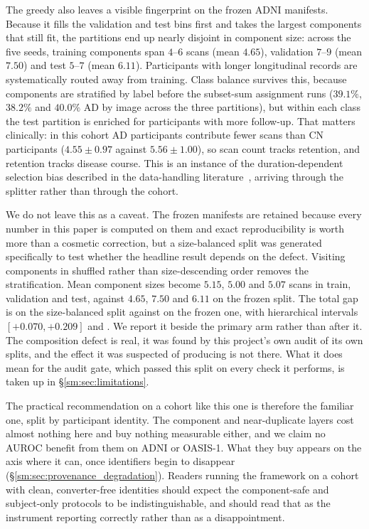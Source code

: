\documentclass[11pt]{article}
\begin{document}
The greedy also leaves a visible fingerprint on the frozen ADNI
manifests. Because it fills the validation and test bins first and
takes the largest components that still fit, the partitions end up
nearly disjoint in component size: across the five seeds, training
components span $4$--$6$ scans (mean $4.65$), validation $7$--$9$
(mean $7.50$) and test $5$--$7$ (mean $6.11$). Participants with
longer longitudinal records are systematically routed away from
training. Class balance survives this, because components are
stratified by label before the subset-sum assignment runs ($39.1\%$, $38.2\%$
and $40.0\%$ AD by image across the three partitions), but within each
class the test partition is enriched for participants with more
follow-up. That matters clinically: in this cohort AD participants
contribute fewer scans than CN participants ($4.55 \pm 0.97$ against
$5.56 \pm 1.00$), so scan count tracks retention, and retention tracks
disease course. This is an instance of the duration-dependent
selection bias described in the data-handling
literature~\cite{rouzrokh2022mitigating}, arriving through the
splitter rather than through the cohort.

We do not leave this as a caveat. The frozen manifests are retained
because every number in this paper is computed on them and exact
reproducibility is worth more than a cosmetic correction, but a
size-balanced split was generated specifically to test whether the
headline result depends on the defect. Visiting components in shuffled rather than size-descending order removes
the stratification. Mean component sizes become $5.15$, $5.00$ and $5.07$
scans in train, validation and test, against $4.65$, $7.50$ and $6.11$ on
the frozen split. The total gap is \SizeBalancedGap{} on the size-balanced
split against \AdniGapTotal{} on the frozen one, with hierarchical intervals
$[+0.070, +0.209]$ and \AdniHierCI{}. We report it beside the primary arm
rather than after it. The composition defect is real, it was found by this
project's own audit of its own splits, and the effect it was suspected
of producing is not there. What it does mean for the audit gate, which
passed this split on every check it performs, is taken up in
\S\ref{sm:sec:limitations}.

The practical recommendation on a cohort like this one is therefore the
familiar one, split by participant identity. The component and near-duplicate
layers cost almost nothing here and buy nothing measurable either, and we claim
no AUROC benefit from them on ADNI or OASIS-1. What they buy appears on the
axis where it can, once identifiers begin to disappear
(\S\ref{sm:sec:provenance_degradation}). Readers running the framework on a
cohort with clean, converter-free identities should expect the component-safe
and subject-only protocols to be indistinguishable, and should read that as the
instrument reporting correctly rather than as a disappointment.
\end{document}
